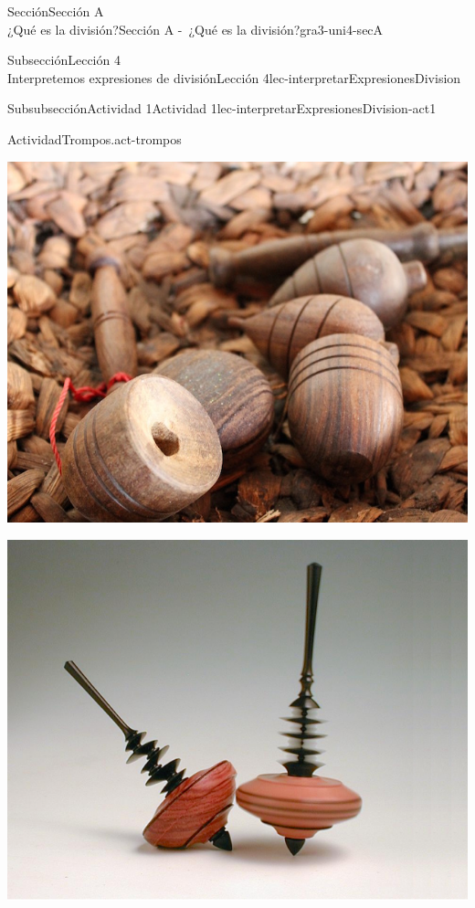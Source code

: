 \begin{sectionptx}{Sección}{{\Large Sección A\\}¿Qué es la división?}{}{Sección A -~¿Qué es la división?}{}{}{gra3-uni4-secA}
\begin{subsectionptx}{Subsección}{{\normalsize Lección 4\\[-0.05cm]}Interpretemos expresiones de división}{}{Lección 4}{}{}{lec-interpretarExpresionesDivision}
\begin{subsubsectionptx}{Subsubsección}{Actividad 1}{}{Actividad 1}{}{}{lec-interpretarExpresionesDivision-act1}
\begin{activity}{Actividad}{Trompos.}{act-trompos}
\begin{sidebyside}{5}{0}{0}{0}
\begin{sbspanel}{0.2}%
\includegraphics[max width=\linewidth, center]{external/jpg-source/V1 3.4.A.4 Indonesian Gasing.jpg}
\end{sbspanel}%
\begin{sbspanel}{0.2}%
\includegraphics[max width=\linewidth, center]{external/png-source/V1 3.4.A.4 German Kreisel Copy.png}
\end{sbspanel}%
\begin{sbspanel}{0.2}%

\end{sbspanel}
\end{sidebyside}
\end{activity}
\end{subsubsectionptx}
\end{subsectionptx}
\end{sectionptx}
